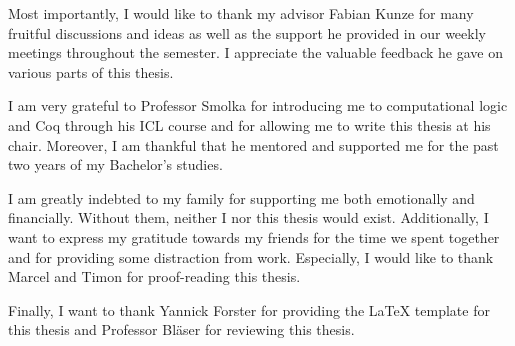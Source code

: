 Most importantly, I would like to thank my advisor Fabian Kunze for many fruitful discussions and ideas as well as the support he provided in our weekly meetings throughout the semester. I appreciate the valuable feedback he gave on various parts of this thesis. 

I am very grateful to Professor Smolka for introducing me to computational logic and Coq through his ICL course and for allowing me to write this thesis at his chair. Moreover, I am thankful that he mentored and supported me for the past two years of my Bachelor's studies. 

I am greatly indebted to my family for supporting me both emotionally and financially. Without them, neither I nor this thesis would exist. 
Additionally, I want to express my gratitude towards my friends for the time we spent together and for providing some distraction from work. Especially, I would like to thank Marcel and Timon for proof-reading this thesis. 

Finally, I want to thank Yannick Forster for providing the \LaTeX{} template for this thesis and Professor Bläser for reviewing this thesis.
